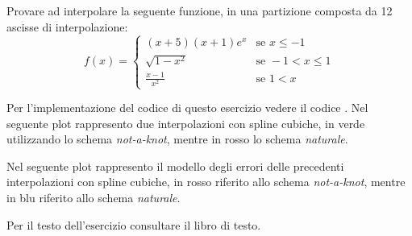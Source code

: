 \begin{exercise} 
Provare ad interpolare la seguente funzione, in una partizione composta da 12
ascisse di interpolazione:
\begin{displaymath}
f(x) = \left \lbrace 
\begin{matrix}
	(x+5)(x+1)e^{x} & \text{se } x \leq -1 \\
	\sqrt{1 - x^{2}} & \text{se } -1 < x \leq 1 \\
	\frac{x-1}{x^{2}} & \text{se } 1 < x
\end{matrix} 
\right. 
\end{displaymath}
\end{exercise}
Per l'implementazione del codice di questo esercizio vedere il codice
.
Nel seguente plot rappresento due interpolazioni con spline cubiche, in verde
utilizzando lo schema \emph{not-a-knot}, mentre in rosso lo schema
\emph{naturale}.
\begin{center}   

\end{center}
Nel seguente plot rappresento il modello degli errori delle precedenti
interpolazioni con spline cubiche, in rosso riferito allo
schema \emph{not-a-knot}, mentre in blu riferito allo schema \emph{naturale}.
\begin{center}   

\end{center}


\begin{exercise}[4.19] 
Per il testo dell'esercizio consultare il libro di testo. 
\end{exercise}
\begin{center}   

\end{center}
\begin{center}   

\end{center}





